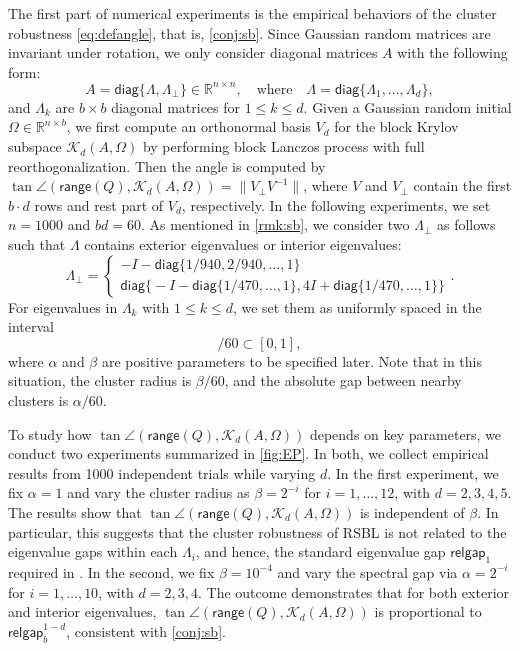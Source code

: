 \documentclass{article}
\newcommand{\R}{\mathbb{R}}
\newcommand{\range}{\mathsf{range}}
\newcommand{\gap}{\mathsf{relgap}}
\providecommand{\diagm}{\mathsf{diag}}
\providecommand{\norm}[1]{\lVert#1\rVert}
\begin{document}
The first part of numerical experiments is the empirical behaviors of the cluster robustness \cref{eq:defangle}, that is, \cref{conj:sb}.
Since Gaussian random matrices are invariant under rotation, we only consider diagonal matrices $A$ with the following form:
\begin{equation*}
    A = \diagm\{\Lambda,\Lambda_{\perp}\}\in\R^{n\times n}, \quad \text{where}\quad 
    \Lambda = \diagm\{\Lambda_{1},\dotsc,\Lambda_{d}\},
\end{equation*}
and $\Lambda_{k}$ are $b\times b$ diagonal matrices for $1\leq k\leq d$. Given a Gaussian random initial $\Omega\in\R^{n\times b}$, we first compute an orthonormal basis $V_{d}$ for the block Krylov subspace $\mathcal{K}_{d}(A,\Omega)$ by performing block Lanczos process with full reorthogonalization. Then the angle is computed by $
    \tan\angle (\range(Q),\mathcal{K}_{d}(A,\Omega)) = \norm{V_{\perp}V^{-1}}$,
where $V$ and $V_{\perp}$ contain the first $b\cdot d$ rows and rest part of $V_{d}$, respectively. In the following experiments, we set $n=1000$ and $bd=60$. 
As mentioned in \cref{rmk:sb}, we consider two $\Lambda_{\perp}$ as follows such that $\Lambda$ contains exterior eigenvalues or interior eigenvalues:
\begin{equation*}
    \Lambda_{\perp} = \begin{cases}
        -I-\diagm\{1/940,2/940,\dotsc,1\}\\ 
        \diagm\bigl\{-I-\diagm\{1/470,\dotsc,1\}, 4I+\diagm\{1/470,\dotsc,1\}\bigr\}
    \end{cases} .
\end{equation*}
For eigenvalues in $\Lambda_{k}$ with $1\leq k\leq d$, we set them as uniformly spaced in the interval 
\begin{equation*}
    [\alpha k+\beta(k-1),\alpha k +\beta(k+1)]/60 \subset [0,1],   
\end{equation*}
where $\alpha$ and $\beta$ are positive parameters to be specified later. Note that in this situation, the cluster radius is $\beta/60$, and the absolute gap between nearby  clusters is $\alpha/60$.

To study how $\tan\angle (\range(Q),\mathcal{K}_{d}(A,\Omega))$ depends on key parameters, we conduct two experiments summarized in \cref{fig:EP}. In both, we collect empirical results from 1000 independent trials while varying $d$. In the first experiment, we fix $\alpha = 1$ and vary the cluster radius as $\beta = 2^{-i}$ for $i = 1,\dotsc,12$, with $d = 2,3,4,5$. The results show that $\tan\angle (\range(Q),\mathcal{K}_{d}(A,\Omega))$ is independent of $\beta$. In particular, this suggests that the cluster robustness of RSBL is not related to the eigenvalue gaps within each $\Lambda_{i}$, and hence, the standard eigenvalue gap $\gap_{1}$ required in \cite{Chen2026}.
In the second, we fix $\beta = 10^{-4}$ and vary the spectral gap via $\alpha = 2^{-i}$ for $i = 1,\dotsc,10$, with $d = 2,3,4$. The outcome demonstrates that for both exterior and interior eigenvalues, $\tan\angle (\range(Q),\mathcal{K}_{d}(A,\Omega))$ is proportional to $\gap_{b}^{1-d}$, consistent with \cref{conj:sb}. 
\end{document}
